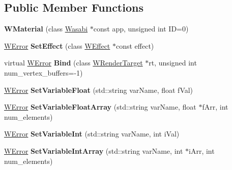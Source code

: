 \subsection*{Public Member Functions}
\begin{DoxyCompactItemize}
\item 
{\bfseries W\+Material} (class \hyperlink{class_wasabi}{Wasabi} $\ast$const app, unsigned int ID=0)\hypertarget{class_w_material_a5bfc9ab92d0ed404bd31e7e85a3a3306}{}\label{class_w_material_a5bfc9ab92d0ed404bd31e7e85a3a3306}

\item 
\hyperlink{class_w_error}{W\+Error} {\bfseries Set\+Effect} (class \hyperlink{class_w_effect}{W\+Effect} $\ast$const effect)\hypertarget{class_w_material_ae48bfe0ea4d05867d077b8b48989c584}{}\label{class_w_material_ae48bfe0ea4d05867d077b8b48989c584}

\item 
virtual \hyperlink{class_w_error}{W\+Error} {\bfseries Bind} (class \hyperlink{class_w_render_target}{W\+Render\+Target} $\ast$rt, unsigned int num\+\_\+vertex\+\_\+buffers=-\/1)\hypertarget{class_w_material_a420e012110ddabf5410bab0805fac025}{}\label{class_w_material_a420e012110ddabf5410bab0805fac025}

\item 
\hyperlink{class_w_error}{W\+Error} {\bfseries Set\+Variable\+Float} (std\+::string var\+Name, float f\+Val)\hypertarget{class_w_material_aa14596445073d1eca1059e51d33af63b}{}\label{class_w_material_aa14596445073d1eca1059e51d33af63b}

\item 
\hyperlink{class_w_error}{W\+Error} {\bfseries Set\+Variable\+Float\+Array} (std\+::string var\+Name, float $\ast$f\+Arr, int num\+\_\+elements)\hypertarget{class_w_material_a95b58dcb45ea3ecf851e635cac37c091}{}\label{class_w_material_a95b58dcb45ea3ecf851e635cac37c091}

\item 
\hyperlink{class_w_error}{W\+Error} {\bfseries Set\+Variable\+Int} (std\+::string var\+Name, int i\+Val)\hypertarget{class_w_material_a1fca266d8755ab2d53c282c68eb69eed}{}\label{class_w_material_a1fca266d8755ab2d53c282c68eb69eed}

\item 
\hyperlink{class_w_error}{W\+Error} {\bfseries Set\+Variable\+Int\+Array} (std\+::string var\+Name, int $\ast$i\+Arr, int num\+\_\+elements)\hypertarget{class_w_material_a880c486ab408e5120bc979e8d721dfc8}{}\label{class_w_material_a880c486ab408e5120bc979e8d721dfc8}


\end{DoxyCompactItemize}
